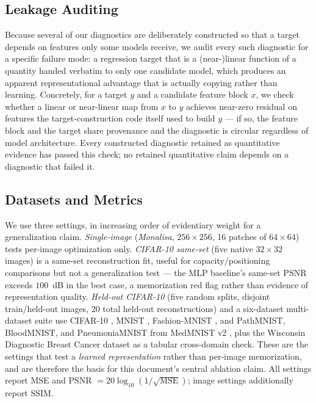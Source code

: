 \documentclass[11pt]{article}
\begin{document}
\subsection{Leakage Auditing}
Because several of our diagnostics are deliberately constructed so that a target depends on features only some models receive, we audit every such diagnostic for a specific failure mode: a regression target that is a (near-)linear function of a quantity handed verbatim to only one candidate model, which produces an apparent representational advantage that is actually copying rather than learning. Concretely, for a target $y$ and a candidate feature block $x$, we check whether a linear or near-linear map from $x$ to $y$ achieves near-zero residual on features the target-construction code itself used to build $y$ --- if so, the feature block and the target share provenance and the diagnostic is circular regardless of model architecture. Every constructed diagnostic retained as quantitative evidence has passed this check; no retained quantitative claim depends on a diagnostic that failed it.

\subsection{Datasets and Metrics}
We use three settings, in increasing order of evidentiary weight for a generalization claim. \textit{Single-image} (\textit{Monalisa}, $256\times256$, 16 patches of $64\times64$) tests per-image optimization only. \textit{CIFAR-10 same-set} (five native $32\times32$ images) is a same-set reconstruction fit, useful for capacity/positioning comparisons but not a generalization test --- the MLP baseline's same-set PSNR exceeds $100$~dB in the best case, a memorization red flag rather than evidence of representation quality. \textit{Held-out CIFAR-10} (five random splits, disjoint train/held-out images, 20 total held-out reconstructions) and a six-dataset multi-dataset suite use CIFAR-10 \cite{Krizhevsky2009}, MNIST \cite{LeCun1998}, Fashion-MNIST \cite{Xiao2017}, and PathMNIST, BloodMNIST, and PneumoniaMNIST from MedMNIST v2 \cite{Yang2023}, plus the Wisconsin Diagnostic Breast Cancer dataset \cite{Wolberg1993} as a tabular cross-domain check. These are the settings that test a \emph{learned representation} rather than per-image memorization, and are therefore the basis for this document's central ablation claim. All settings report MSE and PSNR $=20\log_{10}(1/\sqrt{\mathrm{MSE}})$; image settings additionally report SSIM.
\end{document}
